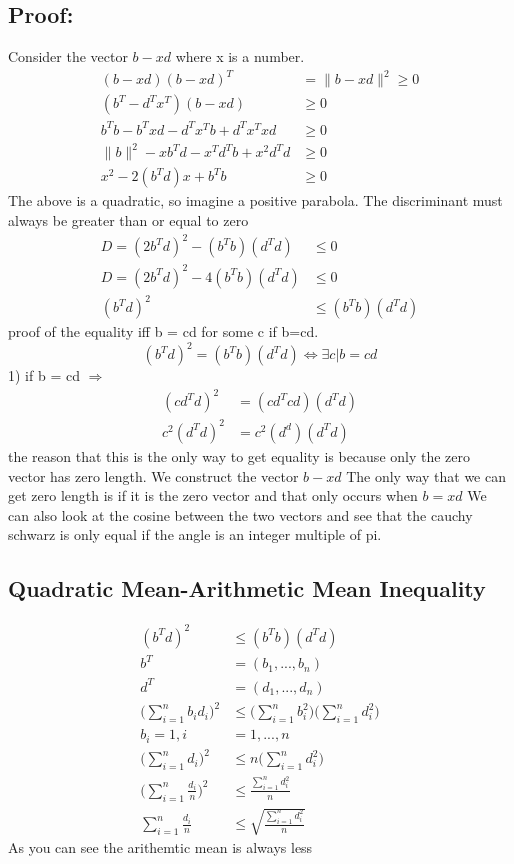 \subsection{Proof:}
Consider the vector $b-xd$ where x is a number.
\begin{align*}
(b-xd)(b-xd)^T  &= \| b-xd\|^2 \geq 0\\
(b^T-d^Tx^T)(b-xd) &\geq 0 \\
b^Tb-b^Txd-d^Tx^Tb+d^Tx^Txd &\geq 0\\
\|b\|^2 -xb^Td-x^Td^Tb+x^2d^Td &\geq 0\\
x^2-2(b^Td)x + b^Tb &\geq 0 
\end{align*}
The above is a quadratic, so imagine a positive parabola. The discriminant must always be greater than or equal to zero
\begin{align*}
D = (2b^Td)^2-(b^Tb)(d^Td) &\leq 0\\
D = (2b^Td)^2-4(b^Tb)(d^Td) &\leq 0 \\
(b^Td)^2 &\leq (b^Tb)(d^Td)
\end{align*}
proof of the equality iff b = cd for some c if b=cd.
\begin{equation}
(b^Td)^2=(b^Tb)(d^Td) \Leftrightarrow \exists c | b=cd
\end{equation}
1) if b = cd $\Rightarrow$
\begin{align*}
    (cd^Td)^2 &= (cd^Tcd)(d^Td) \\
    c^2(d^Td)^2 &= c^2(d^d)(d^Td)  
\end{align*}the reason that this is the only way to get equality is because only the zero vector has zero length. We construct the vector $b-xd$ The only way that we can get zero length is if it is the zero vector and that only occurs when $b=xd$ We can also look at the cosine between the two vectors and see that the cauchy schwarz is only equal if the angle is an integer multiple of pi.
\subsection{Quadratic Mean-Arithmetic Mean Inequality}
\begin{align*}
(b^Td)^2 &\leq(b^Tb)(d^Td)\\
b^T &= (b_1,...,b_n)\\
    d^T &= (d_1,...,d_n)\\
    \Big(\displaystyle\sum_{i=1}^{n}b_id_i\Big)^2 &\leq \Big(\displaystyle\sum_{i=1}^n b_i^2\Big)\Big(\displaystyle\sum_{i=1}^n d_i^2\Big)\\
    b_i =1, i &=1,...,n \\
    \Big(\displaystyle\sum_{i=1}^{n}d_i\Big)^2 &\leq n\Big(\displaystyle\sum_{i=1}^n d_i^2\Big)\\
   \Big(\displaystyle\sum_{i=1}^{n}\frac{d_i}{n}\Big)^2 &\leq \frac{\displaystyle\sum_{i=1}^n d_i^2}{n}\\
    \displaystyle\sum_{i=1}^{n}\frac{d_i}{n} &\leq \sqrt{\frac{\displaystyle\sum_{i=1}^n d_i^2}{n}}
\end{align*}
As you can see the arithemtic mean is always less
